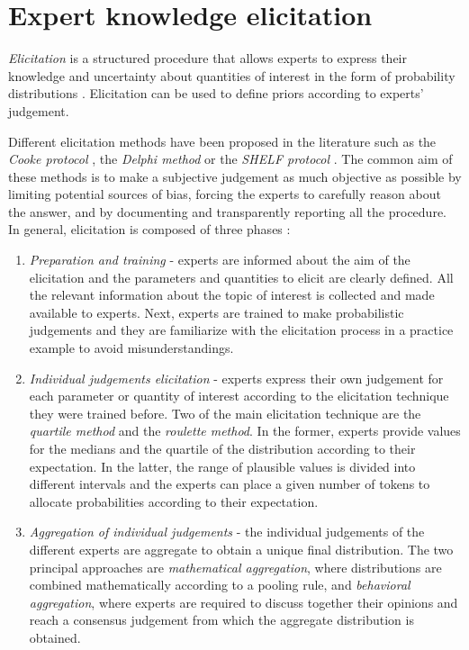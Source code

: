 \documentclass[graybox]{svmult}
\begin{document}
\section{Expert knowledge elicitation}
\label{sec:expert_elicitation}

\emph{Elicitation} is a structured procedure that allows experts to express their knowledge and uncertainty about quantities of interest in the form of probability distributions \cite{ohaganExpertKnowledgeElicitation2019}. Elicitation can be used to define priors according to  experts' judgement.

Different elicitation methods have been proposed in the literature such as the \emph{Cooke protocol} \cite{cookeExpertsUncertaintyOpinion1991}, the \emph{Delphi method} \cite{roweDelphiTechniqueForecasting1999} or the \emph{SHELF protocol} \cite{oakleySHELFSheffieldElicitation2016}. The common aim of these methods is to make a subjective judgement as much objective as possible by limiting potential sources of bias, forcing the experts to carefully reason about the answer, and by documenting and transparently reporting all the procedure. In general, elicitation is composed of three phases \cite{ohaganUncertainJudgementsEliciting2006}:
\begin{enumerate}
	\item{\emph{Preparation and training} - experts are informed about  the aim of the elicitation and the parameters and quantities to elicit are clearly defined. All the relevant information about the topic of interest is collected and made available to experts. Next, experts are trained to make probabilistic judgements and they are familiarize with the elicitation process in a practice example to avoid misunderstandings. }
	\item{\emph{Individual judgements elicitation} - experts express their own judgement for each parameter or quantity of interest according to the elicitation technique they were trained before. Two of the main elicitation technique are the \emph{quartile method} and the \emph{roulette method}. In the former, experts provide values for the medians  and the quartile of the distribution according to their expectation. In the latter, the range of plausible values is divided into different intervals and the experts can place a given number of tokens to allocate probabilities according to  their expectation.}
	\item{\emph{Aggregation of individual judgements} - the individual judgements of the different experts are aggregate to obtain a unique final distribution. The two principal approaches are \emph{mathematical  aggregation}, where distributions are combined mathematically according to a pooling rule, and \emph{behavioral aggregation}, where experts are required to discuss together their opinions and reach a consensus judgement from which the aggregate distribution is obtained.}
\end{enumerate}
\end{document}
